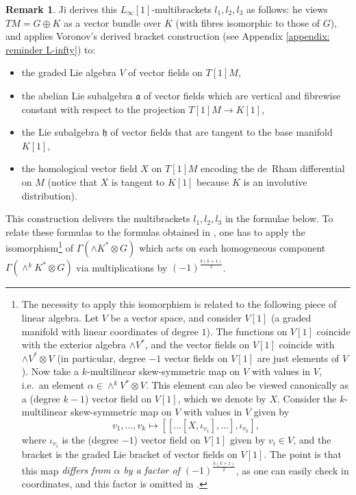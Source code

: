 \documentclass[11pt,thmsa]{amsart}
\theoremstyle{definition}
\newtheorem{remark}[theorem]{Remark}
\begin{document}
\begin{remark}\label{rem:Jisproof}
Ji \cite[Section 4]{Ji} derives this $L_{\infty}[1]$-multibrackets $l_1,l_2,l_3$ as follows: he views $TM=G\oplus K$ as a vector bundle over $K$ (with fibres isomorphic to those of $G$), and 
 applies  Voronov's derived bracket construction (see Appendix \ref{appendix: reminder L-infty}) to:
\begin{itemize}
\item  the graded Lie algebra $V$ of vector fields on $T[1]M$,
\item the abelian Lie subalgebra $\mathfrak{a}$  of vector fields which are  vertical and fibrewise constant with respect to the projection $T[1]M\to K[1]$,
\item the   Lie subalgebra  $\mathfrak{h}$ of vector fields that are tangent to the base manifold $K[1]$,
\item  the homological vector field $X$ on $T[1]M$ encoding the de~Rham differential on $M$ (notice that $X$ is tangent to $K[1]$ because $K$ is an involutive distribution). 
\end{itemize}
This construction delivers the multibrackets $l_1,l_2,l_3$ in the formulae below. To relate these formulas to the formulas obtained in \cite[Remark 4.16]{Ji}, one has to apply the isomorphism\footnote{The necessity to apply this isomorphism is related to the following piece of linear algebra. Let $V$ be a vector space, and consider $V[1]$ (a graded manifold with linear coordinates of degree $1$). The functions on $V[1]$ coincide with the exterior algebra $\wedge V^*$, and the vector fields on $V[1]$ coincide with $\wedge V^*\otimes V$ (in particular, degree $-1$ vector fields on $V[1]$ are just elements of $V$). Now take a $k$-multilinear skew-symmetric map on $V$ with values in $V$, i.e.~an element
$\alpha\in \wedge^kV^*\otimes V$. This element can also be viewed canonically as a (degree $k-1$) vector field on $V[1]$, which we denote by $X$. Consider the $k$-multilinear skew-symmetric map on $V$ with values in $V$ given by
$$v_1,\dots,v_k\mapsto [[\dots[X,\iota_{v_1}],\dots],\iota_{v_k}],$$
where $\iota_{v_i}$ is the (degree $-1$) vector field on $V[1]$ given by $v_i\in V$, and the bracket is the graded Lie bracket of vector fields on $V[1]$. 
The point is that this map \emph{differs from $\alpha$ by a factor of $(-1)^\frac{k(k+1)}{2}$}, as one can easily check in coordinates, and this factor is omitted  in \cite{Ji}.} 
of $\Gamma(\wedge K^*\otimes G)$ which acts on each homogeneous component $\Gamma(\wedge^k K^*\otimes G)$ via multiplications by $(-1)^\frac{k(k+1)}{2}$.


\end{remark}
\end{document}
